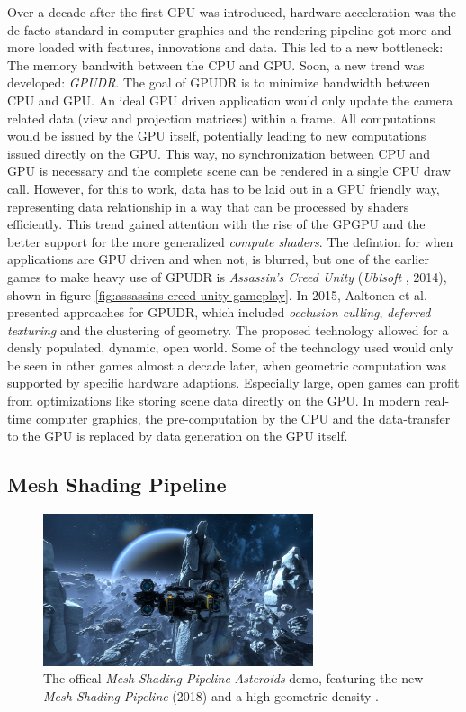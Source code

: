 Over a decade after the first \ac{GPU} was introduced, hardware acceleration was the de facto standard in 
computer graphics and the rendering pipeline got more and more loaded with features, innovations and data. 
This led to a new bottleneck: The memory bandwith between the \ac{CPU} and \ac{GPU}. Soon, a new trend was 
developed: \emph{\ac{GPUDR}}. The goal of \ac{GPUDR} is to minimize bandwidth between \ac{CPU} and \ac{GPU}. 
An ideal \ac{GPU} driven application would only update the camera related data (view and projection matrices) 
within a frame. All computations would be issued by the \ac{GPU} itself, potentially leading to new computations 
issued directly on the \ac{GPU}. This way, no synchronization between \ac{CPU} and \ac{GPU} is necessary and the 
complete scene can be rendered in a single \ac{CPU} draw call. However, for this to work, data has to be laid out 
in a \ac{GPU} friendly way, representing data relationship in a way that can be processed by shaders efficiently.
This trend gained attention with the rise of the \ac{GPGPU} and the better support for the more generalized 
\emph{compute shaders}. The defintion for when applications are \ac{GPU} driven and when not, is blurred, but one 
of the earlier games to make heavy use of \ac{GPUDR} is \emph{Assassin's Creed Unity} 
(\emph{Ubisoft} \cite{Ubisoft2014}, 2014), shown in figure \ref{fig:assassins-creed-unity-gameplay}. 
In 2015, Aaltonen et al. \cite{Aaltonen2015} presented approaches for \ac{GPUDR}, which included \emph{occlusion culling},
\emph{deferred texturing} and the clustering of geometry. The proposed technology allowed for a densly populated, 
dynamic, open world. Some of the technology used would only be seen in other games almost a decade later, when 
geometric computation was supported by specific hardware adaptions. Especially large, open games can profit from 
optimizations like storing scene data directly on the \ac{GPU}. In modern real-time computer graphics, the 
pre-computation by the \ac{CPU} and the data-transfer to the \ac{GPU} is replaced by data generation on the \ac{GPU} itself.

\subsection*{Mesh Shading Pipeline} \label{subsec-mesh-shading-pipeline}


\begin{figure}[h]
    \centering
    \includegraphics[width=300px]{images/graphics/mesh-shading-asteroids-demo.jpg}
    \caption{The offical \emph{Mesh Shading Pipeline} \emph{Asteroids} demo, featuring the new \emph{Mesh Shading Pipeline} (2018)
    and a high geometric density \cite{Kraemer2018}.}
    \label{fig:mesh-shading-asteroids-demo}
\end{figure}

